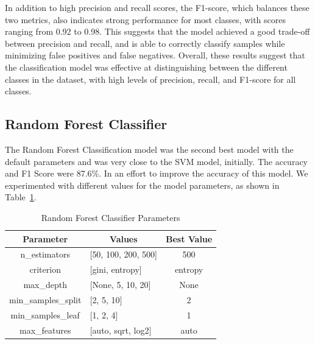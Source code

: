 \documentclass[conference]{IEEEtran}
\begin{document}
In addition to high precision and recall scores, the F1-score, which balances these two metrics, also indicates strong performance for most classes, with scores ranging from 0.92 to 0.98. This suggests that the model achieved a good trade-off between precision and recall, and is able to correctly classify samples while minimizing false positives and false negatives.
Overall, these results suggest that the classification model was effective at distinguishing between the different classes in the dataset, with high levels of precision, recall, and F1-score for all classes.

\subsection{Random Forest Classifier}
The Random Forest Classification model was the second best model with the default parameters and was very close to the SVM model, initially. 
The accuracy and F1 Score were 87.6\%. 
In an effort to improve the accuracy of this model. 
We experimented with different values for the model parameters, as shown in Table~\ref{tab:rf_parameters}.
\begin{table}[!h]
    \centering
    \begin{tabular}{|c|l|c|}
    \hline
    \textbf{Parameter} & \multicolumn{1}{c|}{\textbf{Values}}     & \multicolumn{1}{l|}{\textbf{Best Value}} \\ \hline
    n\_estimators       & {[}50, 100, 200, 500{]}                  & 500                                      \\ \hline
    criterion          & {[}gini, entropy{]}                      & entropy                                  \\ \hline
    max\_depth          & {[}None, 5, 10, 20{]}                    & None                                     \\ \hline
    min\_samples\_split  & {[}2, 5, 10{]}                           & 2                                   \\ \hline
    min\_samples\_leaf   & {[}1, 2, 4{]}                            & 1                                 \\ \hline
    max\_features       & {[}auto, sqrt, log2{]}                   & auto                                    \\ \hline
    \end{tabular}
    \caption{Random Forest Classifier Parameters \label{tab:rf_parameters}}
\end{table}
\end{document}
